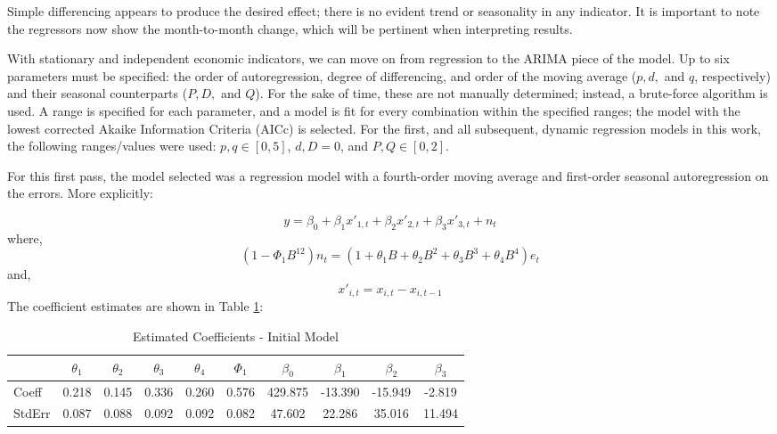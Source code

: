 \documentclass[12pt,letterpaper,toc=flat,oneside]{report}
\theoremstyle{definition}
\theoremstyle{definition}
\theoremstyle{definition}
\theoremstyle{remark}
\begin{document}
Simple differencing appears to produce the desired effect; there is no
evident trend or seasonality in any indicator. It is important to note
the regressors now show the month-to-month change, which will be
pertinent when interpreting results.

With stationary and independent economic indicators, we can move on from
regression to the ARIMA piece of the model. Up to six parameters must be
specified: the order of autoregression, degree of differencing, and
order of the moving average (\(p,d,\) and \(q\), respectively) and their
seasonal counterparts (\(P,D,\) and \(Q\)). For the sake of time, these
are not manually determined; instead, a brute-force algorithm is used. A
range is specified for each parameter, and a model is fit for every
combination within the specified ranges; the model with the lowest
corrected Akaike Information Criteria (AICc) is selected. For the first,
and all subsequent, dynamic regression models in this work, the
following ranges/values were used: \(p,q \in [0,5]\), \(d,D = 0\), and
\(P, Q \in [0,2]\).

For this first pass, the model selected was a regression model with a
fourth-order moving average and first-order seasonal autoregression on
the errors. More explicitly:

\[ y = \beta_0 + \beta_1x'_{1,t} + \beta_2x'_{2,t} + \beta_3x'_{3,t} + n_t\]
where,
\[ (1-\Phi_1 B^{12})n_t = (1 + \theta_1B + \theta_2B^2 + \theta_3B^3 + \theta_4 B^4)e_t \]
and, \[ x'_{i,t} = x_{i,t} - x_{i,t-1}\] The coefficient estimates are
shown in Table \ref{tab:dynreg1-coeff}:

\begin{table}

\caption{\label{tab:dynreg1-coeff}Estimated Coefficients - Initial Model}
\centering
\begin{tabular}[t]{lccccccccc}
\toprule
\bfseries{ } & \bfseries{$\theta_1$} & \bfseries{$\theta_2$} & \bfseries{$\theta_3$} & \bfseries{$\theta_4$} & \bfseries{$\Phi_1$} & \bfseries{$\beta_0$} & \bfseries{$\beta_1$} & \bfseries{$\beta_2$} & \bfseries{$\beta_3$}\\
\midrule
Coeff & 0.218 & 0.145 & 0.336 & 0.260 & 0.576 & 429.875 & -13.390 & -15.949 & -2.819\\
StdErr & 0.087 & 0.088 & 0.092 & 0.092 & 0.082 & 47.602 & 22.286 & 35.016 & 11.494\\
\bottomrule
\end{tabular}
\end{table}
\end{document}
